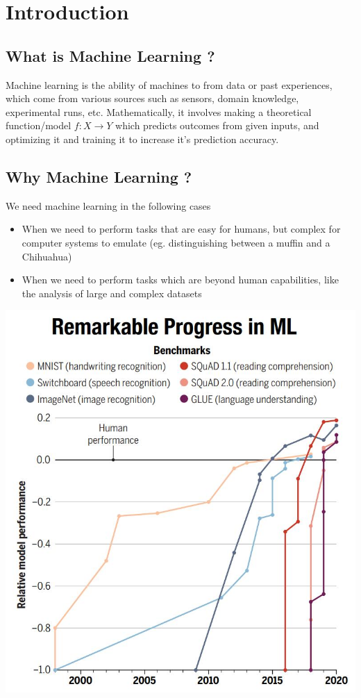 \chapter{Introduction}
\section{What is Machine Learning ?}

Machine learning is the ability of machines to  from data or past experiences, which come from various sources such as sensors, domain knowledge, experimental runs, etc. Mathematically, it involves making a theoretical function/model $f: X \rightarrow Y$ which predicts outcomes from given inputs, and optimizing it and training it to increase it's prediction accuracy.

\section{Why Machine Learning ?}

We need machine learning in the following cases
\begin{itemize}
  \item When we need to perform tasks that are easy for humans, but complex for computer systems to emulate (eg. distinguishing between a muffin and a Chihuahua)
  \item When we need to perform tasks which are beyond human capabilities, like the analysis of large and complex datasets
\end{itemize}

\begin{center}
  \includegraphics[scale=0.25]{"images/01.jpg"}
\end{center}

